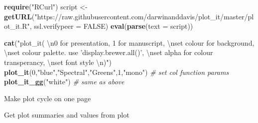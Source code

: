 \documentclass[10,portrait]{article}
\newenvironment{Shaded}{\begin{snugshade}}{\end{snugshade}}
\newcommand{\KeywordTok}[1]{\textcolor[rgb]{0.13,0.29,0.53}{\textbf{#1}}}
\newcommand{\DataTypeTok}[1]{\textcolor[rgb]{0.13,0.29,0.53}{#1}}
\newcommand{\DecValTok}[1]{\textcolor[rgb]{0.00,0.00,0.81}{#1}}
\newcommand{\CharTok}[1]{\textcolor[rgb]{0.31,0.60,0.02}{#1}}
\newcommand{\StringTok}[1]{\textcolor[rgb]{0.31,0.60,0.02}{#1}}
\newcommand{\CommentTok}[1]{\textcolor[rgb]{0.56,0.35,0.01}{\textit{#1}}}
\newcommand{\OtherTok}[1]{\textcolor[rgb]{0.56,0.35,0.01}{#1}}
\newcommand{\OperatorTok}[1]{\textcolor[rgb]{0.81,0.36,0.00}{\textbf{#1}}}
\newcommand{\NormalTok}[1]{#1}
\begin{document}
\begin{Shaded}
\begin{Highlighting}[]
\KeywordTok{require}\NormalTok{(}\StringTok{"RCurl"}\NormalTok{)}
\NormalTok{script <-}\StringTok{ }\KeywordTok{getURL}\NormalTok{(}\StringTok{"https://raw.githubusercontent.com/darwinanddavis/plot_it/master/plot_it.R"}\NormalTok{, }\DataTypeTok{ssl.verifypeer =} \OtherTok{FALSE}\NormalTok{)}
\KeywordTok{eval}\NormalTok{(}\KeywordTok{parse}\NormalTok{(}\DataTypeTok{text =}\NormalTok{ script))}

\KeywordTok{cat}\NormalTok{(}\StringTok{"plot_it( }\CharTok{\textbackslash{}n}\StringTok{0 for presentation, 1 for manuscript, }\CharTok{\textbackslash{}n}\StringTok{set colour for background, }\CharTok{\textbackslash{}n}\StringTok{set colour palette. use 'display.brewer.all()', }\CharTok{\textbackslash{}n}\StringTok{set alpha for colour transperancy, }\CharTok{\textbackslash{}n}\StringTok{set font style }\CharTok{\textbackslash{}n}\StringTok{)"}\NormalTok{)}
\KeywordTok{plot_it}\NormalTok{(}\DecValTok{0}\NormalTok{,}\StringTok{"blue"}\NormalTok{,}\StringTok{"Spectral"}\NormalTok{,}\StringTok{"Greens"}\NormalTok{,}\DecValTok{1}\NormalTok{,}\StringTok{"mono"}\NormalTok{) }\CommentTok{# set col function params}
\KeywordTok{plot_it_gg}\NormalTok{(}\StringTok{"white"}\NormalTok{) }\CommentTok{# same as above }
\end{Highlighting}
\end{Shaded}

Make plot cycle on one page

\begin{Shaded}
\end{Shaded}

Get plot summaries and values from plot

\begin{Shaded}
\end{Shaded}
\end{document}
